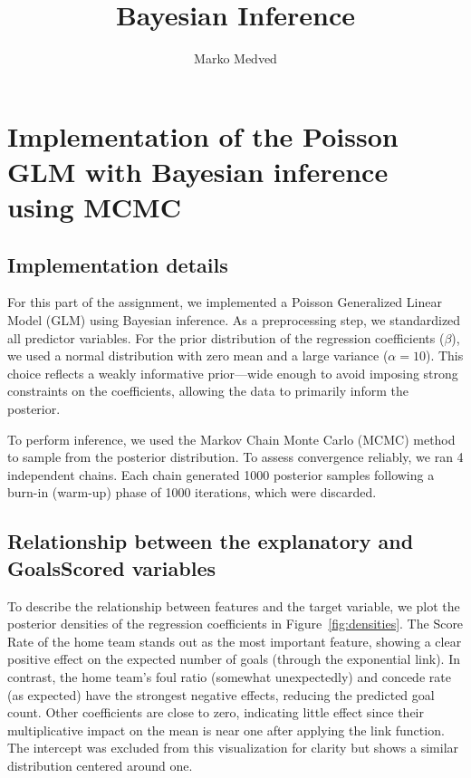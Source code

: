 \documentclass[9pt]{IEEEtran}
\title{\vspace{0ex}
Bayesian Inference}
\author{Marko Medved\vspace{-4.0ex}}
\begin{document}
\maketitle

\section{Implementation of the Poisson GLM with Bayesian inference using MCMC}

\subsection{Implementation details}

For this part of the assignment, we implemented a Poisson
 Generalized Linear Model (GLM) using Bayesian inference. As
  a preprocessing step, we standardized all predictor variables.
   For the prior distribution of 
  the regression coefficients ($\beta$), we used a normal distribution
   with zero mean and a large variance ($\alpha = 10$). This
    choice reflects a weakly informative prior—wide enough to avoid 
    imposing strong constraints on the coefficients,
     allowing the data to primarily inform the posterior.

To perform inference, we used the Markov Chain Monte Carlo (MCMC)
 method to sample from the posterior distribution. To assess 
 convergence reliably, we ran 4 independent chains. Each chain 
 generated 1000 posterior samples following a burn-in (warm-up) 
 phase of 1000 iterations, which were discarded.

\subsection{Relationship between the explanatory and GoalsScored variables}
To describe the relationship between features and the target variable, 
we plot the posterior densities of the regression coefficients in
 Figure~\ref{fig:densities}. The Score Rate of the home team stands 
 out as the most important feature, showing a clear positive effect
  on the expected number of goals (through the exponential link).
   In contrast, the home team’s foul ratio (somewhat unexpectedly) 
   and concede rate (as expected) have the strongest negative 
   effects, reducing the predicted goal count. Other coefficients are
    close to zero, indicating little effect since their multiplicative 
    impact on the mean is near one after applying the link function. 
    The intercept was excluded from this visualization for clarity but 
    shows a similar distribution centered around one.
\end{document}
